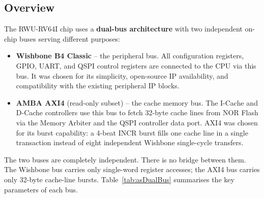 
\subsection{Overview}

The RWU-RV64I chip uses a \textbf{dual-bus architecture} with two
independent on-chip buses serving different purposes:

\begin{itemize}
  \item \textbf{Wishbone B4 Classic} -- the peripheral bus.
    All configuration registers, GPIO, UART, and QSPI control registers
    are connected to the CPU via this bus.
    It was chosen for its simplicity, open-source IP availability, and
    compatibility with the existing peripheral IP blocks.

  \item \textbf{AMBA AXI4} (read-only subset) -- the cache memory bus.
    The I-Cache and D-Cache controllers use this bus to fetch 32-byte
    cache lines from NOR Flash via the Memory Arbiter and the QSPI
    controller data port.
    AXI4 was chosen for its burst capability: a 4-beat INCR burst fills
    one cache line in a single transaction instead of eight independent
    Wishbone single-cycle transfers.
\end{itemize}

The two buses are completely independent.
There is no bridge between them.
The Wishbone bus carries only single-word register accesses;
the AXI4 bus carries only 32-byte cache-line bursts.
Table~\ref{tab:asDualBus} summarises the key parameters of each bus.

